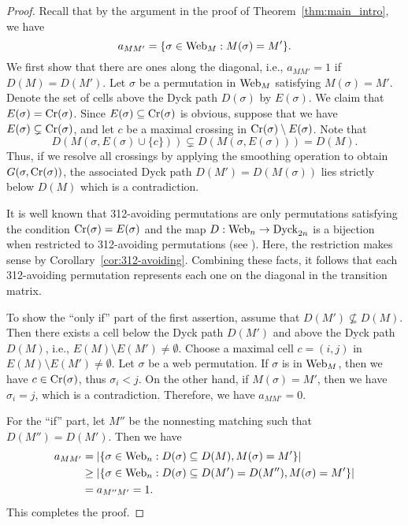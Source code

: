 \begin{proof}
  Recall that by the argument in the proof of Theorem~\ref{thm:main_intro}, we have
  \[
      a_{MM'}=\{\sigma\in\operatorname{Web}_M:M(\sigma)=M'\}.
  \]
  We first show that there are ones along the diagonal, i.e.,
  \( a_{MM'}=1 \) if \( D(M)=D(M') \).
  Let $\sigma$ be a permutation in $\operatorname{Web}_M$ satisfying $M(\sigma)=M'$.
  Denote the set of cells above the Dyck path $D(\sigma)$ by $E(\sigma)$.
  We claim that $E(\sigma)=\operatorname{Cr}(\sigma)$.
  Since \(E(\sigma)\subseteq \operatorname{Cr}(\sigma)\) is obvious, suppose that we have $E(\sigma)\subsetneq\operatorname{Cr}(\sigma)$, and let $c$ be a maximal crossing in \( \operatorname{Cr}(\sigma)\setminus E(\sigma) \).
  Note that \[D(M(\sigma,E(\sigma)\cup \{c\}))\subsetneq D(M(\sigma,E(\sigma)))=D(M).\]
  Thus, if we resolve all crossings by applying the smoothing operation to obtain $G(\sigma,\operatorname{Cr}(\sigma))$, 
  the associated Dyck path $D(M')=D(M(\sigma))$ lies strictly below $D(M)$ 
  which is a contradiction.

  It is well known that 312-avoiding permutations are only permutations satisfying
  the condition \( \operatorname{Cr}(\sigma)=E(\sigma) \) and the map $D:\operatorname{Web}_n\rightarrow \operatorname{Dyck}_{2n}$ is a bijection
  when restricted to 312-avoiding permutations (see \cite[§1.2]{Sta12}).
  Here, the restriction makes sense by Corollary~\ref{cor:312-avoiding}.
  Combining these facts, it follows that each 312-avoiding permutation represents 
  each one on the diagonal in the transition matrix.

  To show the ``only if'' part of the first assertion, assume that $D(M') \nsubseteq D(M)$.
  Then there exists a cell below the Dyck path $D(M')$ and above the Dyck path
  $D(M)$, i.e., \( E(M)\setminus E(M')\neq\emptyset. \)
  Choose a maximal cell $c=(i,j)$ in \( E(M)\setminus E(M')\neq\emptyset. \)
  Let $\sigma$ be a web permutation. 
  If $\sigma$ is in $\operatorname{Web}_M$, then we have $c\in\operatorname{Cr}(\sigma)$, thus $\sigma_i<j$. 
  On the other hand, if $M(\sigma)=M'$, then we have $\sigma_i=j$, which is a contradiction. 
  Therefore, we have \( a_{MM'}=0 \).

  For the ``if'' part, let $M''$ be the nonnesting matching such that $D(M'')=D(M')$. Then we have
  \begin{align*}
    a_{MM'} 
    &= |\{\sigma \in \operatorname{Web}_n: D(\sigma)\subseteq D(M), M(\sigma)=M'\}| \\
    &\ge |\{\sigma \in \operatorname{Web}_n: D(\sigma)\subseteq D(M')=D(M''), M(\sigma)=M'\}| \\
    &= a_{M''M'}=1.
  \end{align*}
  This completes the proof.
\end{proof}


